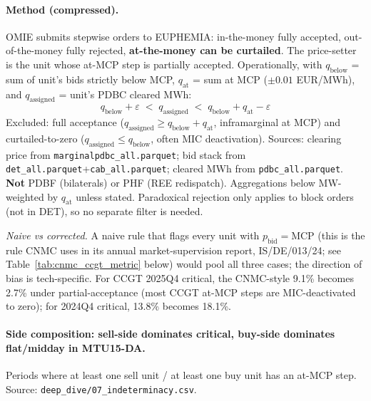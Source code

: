 \documentclass[11pt,a4paper]{article}
\newcommand{\code}[1]{\nolinkurl{#1}}
\begin{document}
\paragraph{Method (compressed).} OMIE submits stepwise orders to EUPHEMIA: in-the-money fully accepted, out-of-the-money fully rejected, \textbf{at-the-money can be curtailed}. The price-setter is the unit whose at-MCP step is partially accepted. Operationally, with $q_{\text{below}}$ = sum of unit's bids strictly below MCP, $q_{\text{at}}$ = sum at MCP ($\pm 0.01$ EUR/MWh), and $q_{\text{assigned}}$ = unit's PDBC cleared MWh:
\[
  q_{\text{below}} + \varepsilon \;<\; q_{\text{assigned}} \;<\; q_{\text{below}} + q_{\text{at}} - \varepsilon
\]
Excluded: full acceptance ($q_{\text{assigned}} \ge q_{\text{below}} + q_{\text{at}}$, inframarginal at MCP) and curtailed-to-zero ($q_{\text{assigned}} \le q_{\text{below}}$, often MIC deactivation). Sources: clearing price from \code{marginalpdbc_all.parquet}; bid stack from \code{det_all.parquet}+\code{cab_all.parquet}; cleared MWh from \code{pdbc_all.parquet}. \textbf{Not} PDBF (bilaterals) or PHF (REE redispatch). Aggregations below MW-weighted by $q_{\text{at}}$ unless stated. Paradoxical rejection only applies to block orders (not in DET), so no separate filter is needed.

\emph{Naive vs corrected.} A naive rule that flags every unit with $p_{\text{bid}}=\text{MCP}$ (this is the rule CNMC uses in its annual market-supervision report, IS/DE/013/24; see Table~\ref{tab:cnmc_ccgt_metric} below) would pool all three cases; the direction of bias is tech-specific. For CCGT 2025Q4 critical, the CNMC-style 9.1\% becomes 2.7\% under partial-acceptance (most CCGT at-MCP steps are MIC-deactivated to zero); for 2024Q4 critical, 13.8\% becomes 18.1\%.

\paragraph{Side composition: sell-side dominates critical, buy-side dominates flat/midday in MTU15-DA.} Periods where at least one sell unit / at least one buy unit has an at-MCP step. Source: \code{deep_dive/07_indeterminacy.csv}.
\end{document}
